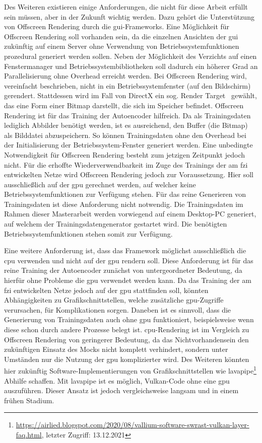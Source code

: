 Des Weiteren existieren einige Anforderungen, die nicht für diese Arbeit erfüllt sein müssen, aber in der Zukunft wichtig werden. Dazu gehört die Unterstützung von Offscreen Rendering durch die \gls{gui}-Frameworks. Eine Möglichkeit für Offscreen Rendering soll vorhanden sein, da die einzelnen Ansichten der \gls{gui} zukünftig auf einem Server ohne Verwendung von Betriebssystemfunktionen prozedural generiert werden sollen. Neben der Möglichkeit des Verzichts auf einen Fenstermanager und Betriebssystembibliotheken soll dadurch ein höherer Grad an Parallelisierung ohne Overhead erreicht werden. Bei Offscreen Rendering wird, vereinfacht beschrieben, nicht in ein Betriebssystemfenster (\dh auf den Bildschirm) gerendert. Stattdessen wird \zb im Fall von DirectX ein sog. Render Target~\cite{stevewhimsRenderTargetsOverview} gewählt, das eine Form einer Bitmap darstellt, die sich im Speicher befindet.
Offscreen Rendering ist für das Training der Autoencoder hilfreich. Da als Trainingsdaten lediglich Abbilder benötigt werden, ist es ausreichend, den Buffer (\dh die Bitmap) als Bilddatei abzuspeichern. So können Trainingsdaten ohne den Overhead bei der Initialisierung der Betriebssystem-Fenster generiert werden. Eine unbedingte Notwendigkeit für Offscreen Rendering besteht zum jetzigen Zeitpunkt jedoch nicht. Für die erhoffte Wiederverwendbarkeit im Zuge des Trainings der am \gls{fzi} entwickelten Netze wird Offscreen Rendering jedoch zur Voraussetzung. Hier soll ausschließlich auf der \gls{gpu} gerechnet werden, auf welcher keine Betriebssystemfunktionen zur Verfügung stehen.
Für das reine Generieren von Trainingsdaten ist diese Anforderung nicht notwendig. Die Trainingsdaten im Rahmen dieser Masterarbeit werden vorwiegend auf einem Desktop-PC generiert, auf welchem der Trainingsdatengenerator gestartet wird. Die benötigten Betriebssystemfunktionen stehen somit zur Verfügung.

Eine weitere Anforderung ist, dass das Framework möglichst ausschließlich die \gls{cpu} verwenden und nicht auf der \gls{gpu} rendern soll. Diese Anforderung ist für das reine Training der Autoencoder zunächst von untergeordneter Bedeutung, da hierfür ohne Probleme die \gls{gpu} verwendet werden kann. Da das Training der am \gls{fzi} entwickelten Netze jedoch auf der \gls{gpu} stattfinden soll, könnten Abhängigkeiten zu Grafikschnittstellen, welche zusätzliche \gls{gpu}-Zugriffe verursachen, für Komplikationen sorgen. Daneben ist es sinnvoll, dass die Generierung von Trainingsdaten auch ohne \gls{gpu} funktioniert, beispielsweise wenn diese schon durch andere Prozesse belegt ist. \gls{cpu}-Rendering ist im Vergleich zu Offscreen Rendering von geringerer Bedeutung, da das Nichtvorhandensein den zukünftigen Einsatz des Mocks nicht komplett verhindert, sondern unter Umständen nur die Nutzung der \gls{gpu} komplizierter wird. Des Weiteren könnten hier zukünftig Software-Implementierungen von Grafikschnittstellen wie lavapipe\footnote{\url{https://airlied.blogspot.com/2020/08/vallium-software-swrast-vulkan-layer-faq.html}, letzter Zugriff: 13.12.2021} Abhilfe schaffen. Mit lavapipe ist es möglich, Vulkan-Code ohne eine \gls{gpu} auszuführen. Dieser Ansatz ist jedoch vergleichsweise langsam und in einem frühen Stadium.

